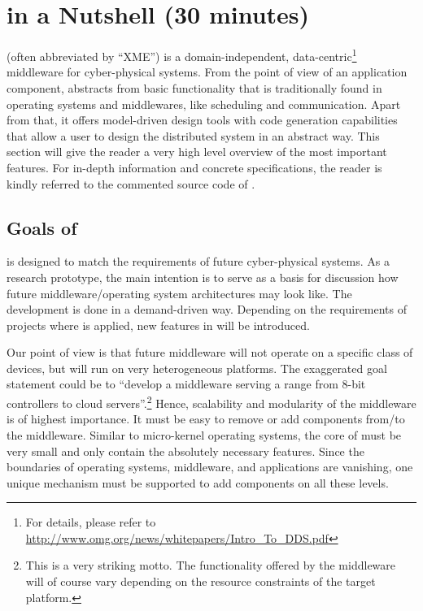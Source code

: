 %
% 
%
%
%

\section{\xme in a Nutshell (30 minutes)}
\label{sec:architecture}

\xme (often abbreviated by ``XME'') is a domain-independent, data-centric\footnote{%
For details, please refer to \url{http://www.omg.org/news/whitepapers/Intro_To_DDS.pdf}}
middleware for cyber-physical systems.
%
From the point of view of an application component,
\xme abstracts from basic functionality that is traditionally found in operating systems and middlewares,
like scheduling and communication.
Apart from that, it offers model-driven design tools with code generation capabilities
that allow a user to design the distributed system in an abstract way.
%
This section will give the reader a very high level overview of the most important \xme features.
For in-depth information and concrete specifications, the reader is kindly referred to the commented source code of \xme.

\subsection{Goals of \xme}
\xme is designed to match the requirements of future cyber-physical systems.
As a research prototype, the main intention is to serve as a basis
for discussion how future middleware/operating system architectures may look like.
The development is done in a demand-driven way.
Depending on the requirements of projects where \xme is applied, new features in \xme will be introduced.

Our point of view is that
future middleware will not operate on a specific class of devices, but will run on very heterogeneous platforms.
The exaggerated goal statement could be to ``develop a middleware serving a range from 8-bit controllers to cloud servers''.\footnote{%
	This is a very striking motto.
	The functionality offered by the middleware will of course vary depending on the resource constraints of the target platform.
}
%
Hence, scalability and modularity of the middleware is of highest importance. It must be easy to remove or add components from/to 
the middleware. Similar to micro-kernel operating systems, the core of \xme must be very small and only contain the absolutely necessary
features. Since the boundaries of operating systems, middleware, and applications are vanishing, one unique mechanism must be supported to
add components on all these levels.

